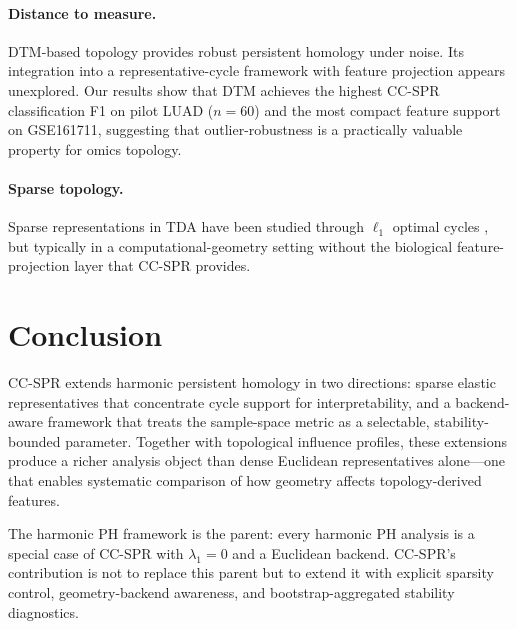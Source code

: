 \documentclass[11pt]{article}
\begin{document}
\paragraph{Distance to measure.}
DTM-based topology \cite{chazal2011dtm, chazal2017robust} provides robust persistent homology under noise.
Its integration into a representative-cycle framework with feature projection appears unexplored.
Our results show that DTM achieves the highest CC-SPR classification F1 on pilot LUAD ($n = 60$) and the most compact feature support on GSE161711, suggesting that outlier-robustness is a practically valuable property for omics topology.

\paragraph{Sparse topology.}
Sparse representations in TDA have been studied through $\ell_1$ optimal cycles \cite{chen2011hardness, dey2011optimal}, but typically in a computational-geometry setting without the biological feature-projection layer that CC-SPR provides.

\section{Conclusion}
\label{sec:conclusion}

CC-SPR extends harmonic persistent homology in two directions: sparse elastic representatives that concentrate cycle support for interpretability, and a backend-aware framework that treats the sample-space metric as a selectable, stability-bounded parameter.
Together with topological influence profiles, these extensions produce a richer analysis object than dense Euclidean representatives alone---one that enables systematic comparison of how geometry affects topology-derived features.

The harmonic PH framework is the parent: every harmonic PH analysis is a special case of CC-SPR with $\lambda_1 = 0$ and a Euclidean backend.
CC-SPR's contribution is not to replace this parent but to extend it with explicit sparsity control, geometry-backend awareness, and bootstrap-aggregated stability diagnostics.
\end{document}
